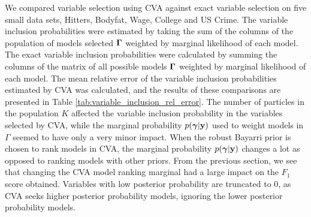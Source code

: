 We compared variable selection using CVA against exact variable selection on five small data sets,
Hitters, Bodyfat, Wage, College and US Crime. 
The variable inclusion probabilities were estimated by taking the sum of the columns of the population
of models selected ${\boldsymbol \Gamma}$
weighted by marginal likelihood of each model.
The exact variable inclusion probabilities were calculated by summing the columns of the matrix of all possible
models ${\boldsymbol \Gamma}$ weighted by marginal likelihood of each model.
The mean relative error of the variable inclusion probabilities estimated by CVA was calculated,
and the results of these comparisons are presented in Table \ref{tab:variable_inclusion_rel_error}.
The number of particles in the population $K$ affected the
variable inclusion probability in the variables selected by CVA, while the marginal probability
$p({\boldsymbol \gamma} | {\bf y})$ used to weight models in $\Gamma$ seemed to have only a very minor impact.
When the robust Bayarri prior is chosen to rank models in CVA,
the marginal probability $p({\boldsymbol \gamma} | {\bf y})$ changes a lot as opposed to ranking models with other priors.
From the previous section, we see that changing the CVA model ranking
marginal had a large impact on the $F_1$ score obtained.
Variables with low posterior probability are truncated to 0, as CVA seeks higher posterior probability models,
ignoring the lower posterior probability models.

